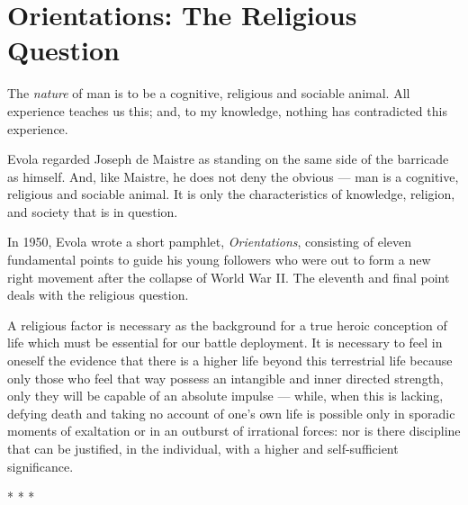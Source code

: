 \section{Orientations: The Religious Question}

\begin{quotex}
The \emph{nature} of man is to be a cognitive, religious and sociable animal. All experience teaches us this; and, to my knowledge, nothing has contradicted this experience.
\end{quotex}

Evola regarded Joseph de Maistre as standing on the same side of the barricade as himself. And, like Maistre, he does not deny the obvious --- man is a cognitive, religious and sociable animal. It is only the characteristics of knowledge, religion, and society that is in question.

In 1950, Evola wrote a short pamphlet, \emph{Orientations}, consisting of eleven fundamental points to guide his young followers who were out to form a new right movement after the collapse of World War II. The eleventh and final point deals with the religious question.

\begin{quotex}
A religious factor is necessary as the background for a true heroic conception of life which must be essential for our battle deployment. It is necessary to feel in oneself the evidence that there is a higher life beyond this terrestrial life because only those who feel that way possess an intangible and inner directed strength, only they will be capable of an absolute impulse --- while, when this is lacking, defying death and taking no account of one's own life is possible only in sporadic moments of exaltation or in an outburst of irrational forces: nor is there discipline that can be justified, in the individual, with a higher and self-sufficient significance.
\end{quotex}


\begin{center}* * *\end{center}

